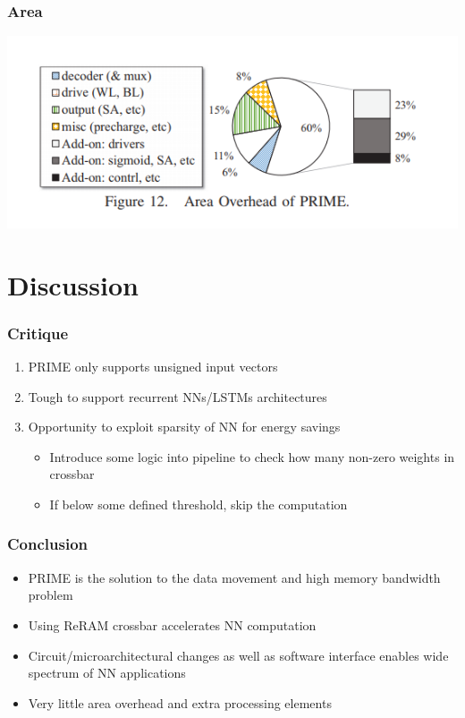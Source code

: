 \documentclass[hyperref={colorlinks}]{beamer}
\begin{document}
\begin{frame}
	\frametitle{Area}
	\includegraphics[scale=0.5, center]{area.png}	
\end{frame}

\section{Discussion}
\begin{frame}
	\frametitle{Critique}
	\begin{enumerate}
		\item PRIME only supports unsigned input vectors
		\item Tough to support recurrent NNs/LSTMs architectures
		\item Opportunity to exploit sparsity of NN for energy savings
		\begin{itemize}
			\item Introduce some logic into pipeline to check how many non-zero weights in crossbar
			\item If below some defined threshold, skip the computation
		\end{itemize}
	\end{enumerate}
\end{frame}
\begin{frame}
	\frametitle{Conclusion}
	\begin{itemize}
		\item PRIME is the solution to the data movement and high memory bandwidth problem
		\item Using ReRAM crossbar accelerates NN computation
		\item Circuit/microarchitectural changes as well as software interface enables wide spectrum of NN applications
		\item Very little area overhead and extra processing elements
	\end{itemize}
\end{frame}
\end{document}
